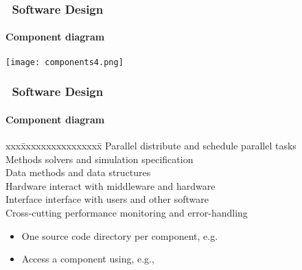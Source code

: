 \begin{frame}[fragile] 
\frametitle{\cello\ Software Design}
\framesubtitle{Component diagram}
\centerline{\texttt{[image: components4.png]}}
\end{frame}

\begin{frame}[fragile] 
\frametitle{\cello\ Software Design}
\framesubtitle{Component diagram}

\begin{tabbing}
xxx\=xxxxxxxxxxxxxxxx\=\kill
\>  {\color{orange} Parallel} \> distribute and schedule parallel tasks \\
\>  {\color{blue} Methods} \> solvers and simulation specification \\
\>  {\color{cyan} Data} \> methods and data structures \\
\>  {\color{magenta} Hardware} \> interact with middleware and hardware \\
\>  {\color{red} Interface} \> interface with users and other software \\
\>  {\color{green} Cross-cutting} \> performance monitoring and error-handling
\end{tabbing}

\begin{itemize}
\item One source code directory per component, e.g. 
\item Access a component using, e.g., 
\end{itemize}
\end{frame}


